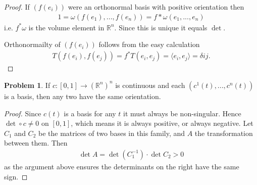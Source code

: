 \documentclass[20pt]{article}
\theoremstyle{plain}
\theoremstyle{definition}
\newtheorem*{problem}{Problem}
\newcommand{\reals}{\mathbb{R}}
\begin{document}
\begin{proof}
  If $(f(e_i))$ were an orthonormal basis with positive orientation then 
  \begin{align*}
    1 = \omega( f(e_1), ..., f(e_n) ) = f*\omega(e_1, ..., e_n)
  \end{align*}
  i.e. $f^*\omega$ is the volume element in $\reals^n$.  Since this is unique it equals $\det$.

  Orthonormailty of $(f(e_i))$ follows from the easy calculation
  \begin{align*}
    T(f(e_i), f(e_j)) = f^*T(e_i, e_j) = \langle e_i, e_j \rangle = \delta{ij}.
  \end{align*}
\end{proof}




\begin{problem}{4.5}
    If $c: [0, 1] \to (\reals^n)^n$ is continuous and each $(c^1(t), ..., c^n(t))$ is a basis, 
    then any two have the same orientation. 
\end{problem}

\begin{proof}
  Since $c(t)$ is a basis for any $t$ it must always be non-singular.
  Hence $\det \circ c \neq 0$ on $[0, 1]$, which means it is always 
  positive, or always negative.
  Let $C_1$ and $C_2$ be the matrices of two bases in this family, and $A$ the transformation between them. 
  Then 
  \begin{align*}
    \det A = \det(C^{-1}_1) \cdot \det C_2 > 0
  \end{align*}
  as the argument above ensures the determinants on the right have the same sign.
\end{proof}
\end{document}
